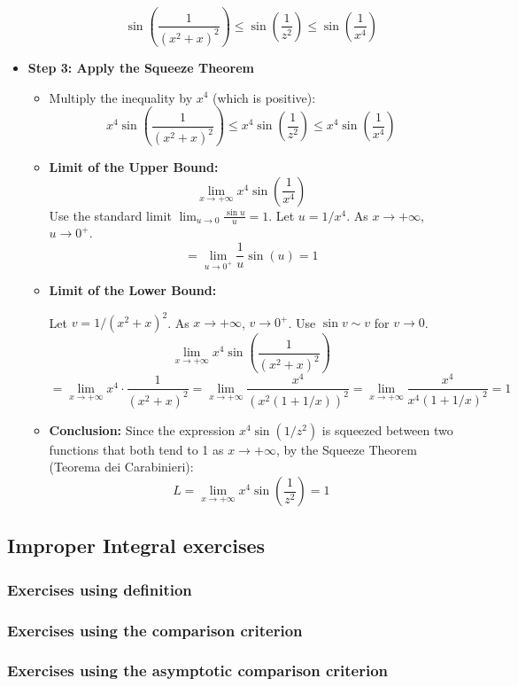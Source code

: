 \begin{cascade}
\begin{itemize}
\begin{itemize}
			            \[ \sin\left(\frac{1}{(x^2+x)^2}\right) \le \sin\left(\frac{1}{z^2}\right) \le \sin\left(\frac{1}{x^4}\right) \]
		      \end{itemize}
		\item \textbf{Step 3: Apply the Squeeze Theorem}
		      \begin{itemize}
			      \item Multiply the inequality by $x^4$ (which is positive):
			            \[ x^4 \sin\left(\frac{1}{(x^2+x)^2}\right) \le x^4 \sin\left(\frac{1}{z^2}\right) \le x^4 \sin\left(\frac{1}{x^4}\right) \]
			      \item \textbf{Limit of the Upper Bound:}
			            \[ \lim_{x \to +\infty} x^4 \sin\left(\frac{1}{x^4}\right) \]
			            Use the standard limit $\lim_{u \to 0} \frac{\sin u}{u} = 1$. Let $u = 1/x^4$. As $x \to +\infty$, $u \to 0^+$.
			            \[ = \lim_{u \to 0^+} \frac{1}{u} \sin(u) = 1 \]
			      \item \textbf{Limit of the Lower Bound:}

			            Let $v = 1/(x^2+x)^2$. As $x \to +\infty$, $v \to 0^+$. Use $\sin v \sim v$ for $v \to 0$.
			            \[ \lim_{x \to +\infty} x^4 \sin\left(\frac{1}{(x^2+x)^2}\right) \]
			            \[ = \lim_{x \to +\infty} x^4 \cdot \frac{1}{(x^2+x)^2} = \lim_{x \to +\infty} \frac{x^4}{(x^2(1+1/x))^2} = \lim_{x \to +\infty} \frac{x^4}{x^4(1+1/x)^2} = 1 \]
			      \item \textbf{Conclusion:} Since the expression $x^4 \sin(1/z^2)$ is squeezed between two functions that both tend to 1 as $x \to +\infty$, by the Squeeze Theorem (Teorema dei Carabinieri):
			            \[ L = \lim_{x \to +\infty} x^4 \sin\left(\frac{1}{z^2}\right) = 1 \]
		      \end{itemize}
	\end{itemize}
\end{cascade}

\clearpage

\subsection{Improper Integral exercises}

\subsubsection{Exercises using definition}

\subsubsection{Exercises using the comparison criterion}

\subsubsection{Exercises using the asymptotic comparison criterion }

\clearpage

